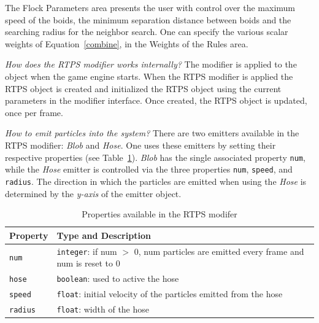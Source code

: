 The Flock Parameters area presents the user with control over the maximum speed of the boids, the minimum separation distance between boids and the searching radius for the neighbor search. One can specify the various scalar weights of Equation~\ref{combine}, in the Weights of the Rules area.

\textit{How does the RTPS modifier works internally?} The modifier is applied to the object when the game engine starts. When the RTPS modifier is applied the RTPS object is created and initialized the RTPS object using the current parameters in the modifier interface. Once created, the RTPS object is updated, once per frame. 

\textit{How to emit particles into the system?} There are two emitters available in the RTPS modifier: \textit{Blob} and \textit{Hose}. One uses these emitters by setting their respective properties (see Table~\ref{properties}). \textit{Blob} has the single associated property \texttt{num}, while the \textit{Hose} emitter is controlled via the three properties \texttt{num}, \texttt{speed}, and \texttt{radius}. The direction in which the particles are emitted when using the \textit{Hose} is determined by the \textit{y-axis} of the emitter object. 

\begin{table}[htdp]
\caption{Properties available in the RTPS modifer}
\begin{center}
\begin{tabular}{|p{3cm}|p{9cm}|}
\hline 
\textbf{Property} & \textbf{Type and Description} \\\hline 
\texttt{num} 	& \texttt{integer}: if num $>$ 0, num particles are emitted every frame and num is reset to 0	\\\hline 
\texttt{hose}	& \texttt{boolean}: used to active the hose	\\\hline
\texttt{speed}	& \texttt{float}: initial velocity of the particles emitted from the hose	\\\hline
\texttt{radius}	& \texttt{float}: width of the hose	\\ %
\hline 
\end{tabular}
\end{center}
\label{properties}
\end{table}

